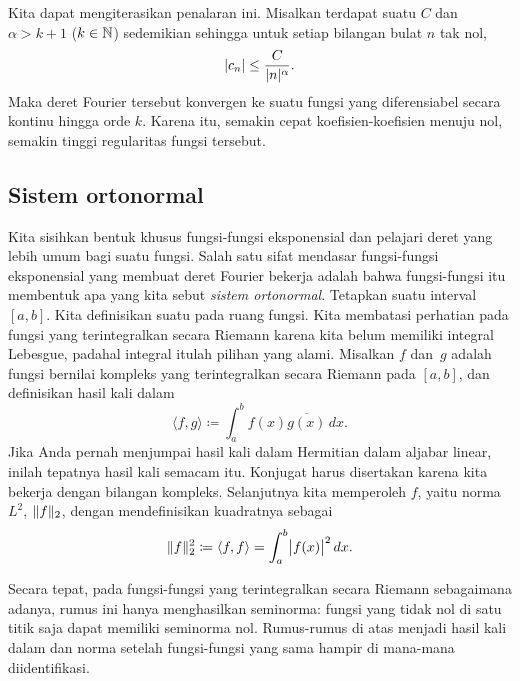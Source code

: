 Kita dapat mengiterasikan penalaran ini.
Misalkan terdapat
suatu $C$ dan $\alpha > k+1$ ($k \in {\mathbb{N}}$) sedemikian sehingga
untuk setiap bilangan bulat $n$ tak nol,
\begin{equation*}
\lvert {c_n} \rvert 
\leq \frac{C}{\lvert {n} \rvert^\alpha} .
\end{equation*}
Maka
deret Fourier tersebut konvergen ke suatu fungsi yang diferensiabel secara kontinu
hingga orde $k$. Karena itu, semakin cepat koefisien-koefisien menuju nol, semakin tinggi
regularitas fungsi tersebut.

\subsection{Sistem ortonormal}

Kita sisihkan bentuk khusus fungsi-fungsi eksponensial dan
pelajari deret yang lebih umum bagi suatu fungsi.
Salah satu sifat mendasar fungsi-fungsi eksponensial yang membuat deret Fourier bekerja
adalah bahwa fungsi-fungsi itu membentuk apa yang kita sebut \emph{sistem ortonormal}.
Tetapkan suatu interval $[a,b]$. Kita definisikan suatu
\emph{} pada ruang fungsi. Kita membatasi perhatian
pada fungsi yang terintegralkan secara Riemann karena kita belum memiliki integral
Lebesgue, padahal integral itulah
pilihan yang alami. Misalkan $f$ dan~$g$ adalah fungsi bernilai kompleks
yang terintegralkan secara Riemann pada $[a,b]$, dan definisikan hasil kali dalam
\begin{equation*}
\langle f , g \rangle \coloneqq
\int_a^b f(x) \overline{g(x)} \, dx .
\end{equation*}
Jika Anda pernah menjumpai hasil kali dalam Hermitian dalam aljabar linear,
inilah tepatnya hasil kali semacam itu. Konjugat harus disertakan karena kita
bekerja dengan bilangan kompleks. Selanjutnya kita memperoleh  $f$,
yaitu norma $L^2$, $\lVert {f} \rVert_2$, dengan mendefinisikan kuadratnya sebagai
\begin{equation*}
\lVert {f} \rVert_2^2 \coloneqq
\langle f , f \rangle =
\int_a^b \bigl\lvert {f(x)} \bigr\rvert^2 \, dx .
\end{equation*}

\begin{remark}
Secara tepat, pada fungsi-fungsi yang terintegralkan secara Riemann sebagaimana adanya,
rumus ini hanya menghasilkan seminorma: fungsi yang tidak nol di satu titik saja dapat memiliki seminorma nol.
Rumus-rumus di atas menjadi hasil kali dalam dan norma setelah fungsi-fungsi yang sama hampir di mana-mana diidentifikasi.
\end{remark}

